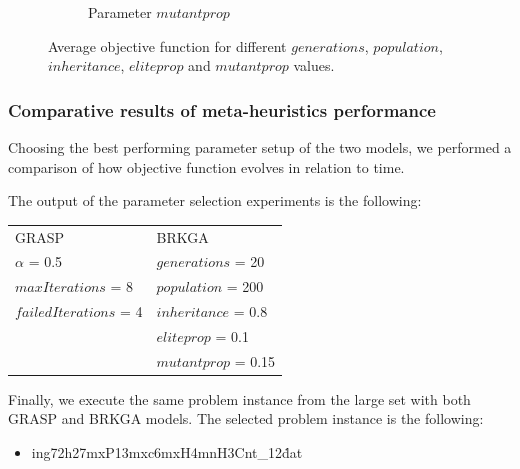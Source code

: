 \begin{figure}[H]
\begin{subfigure}[b]{.49\linewidth}
\caption{Parameter $mutantprop$ }\label{fig2e}
\end{subfigure}%
\caption{Average objective function for different  $generations$,  $population$,  $inheritance$,  $eliteprop$ and  $mutantprop$ values.  }
\label{fig_brkga_params}
\end{figure}





\subsubsection{Comparative results of meta-heuristics performance}

Choosing the best performing parameter setup of the two models, we performed a comparison of how objective function evolves in relation to time.

The output of the parameter selection experiments is the following: 


\begin{tabular}{ll}
GRASP &  BRKGA \\
 $\alpha$ = 0.5  &  $generations$ = 20 \\
 $maxIterations$ = 8 &  $population$ = 200 \\
 $failedIterations$ = 4 & $inheritance$ = 0.8 \\
 						&  $eliteprop$ = 0.1 \\
 						& $mutantprop$ = 0.15 \\


\end{tabular}

Finally, we execute the same problem instance from the large set with both GRASP and BRKGA models. The selected problem instance is the following:
\begin{itemize}
	\item i\-ng\-72h\-27mxP\-13mxc\-6mxH\-4mnH\-3Cnt\_12\.dat
\end{itemize}



